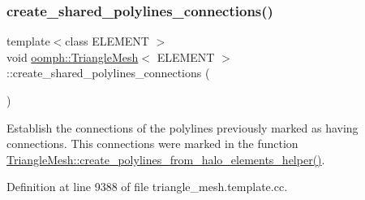 \mbox{\label{classoomph_1_1TriangleMesh_a2645a78aa55dacf39530dd087d894d79}} 
\subsubsection{\texorpdfstring{create\+\_\+shared\+\_\+polylines\+\_\+connections()}{create\_shared\_polylines\_connections()}}
{\footnotesize\ttfamily template$<$class E\+L\+E\+M\+E\+NT $>$ \\
void \hyperlink{classoomph_1_1TriangleMesh}{oomph\+::\+Triangle\+Mesh}$<$ E\+L\+E\+M\+E\+NT $>$\+::create\+\_\+shared\+\_\+polylines\+\_\+connections (\begin{DoxyParamCaption}{ }\end{DoxyParamCaption})\hspace{0.3cm}{\ttfamily [protected]}}



Establish the connections of the polylines previously marked as having connections. This connections were marked in the function \hyperlink{classoomph_1_1TriangleMesh_a1589b532530c3a8ddfb88f93b2e832ea}{Triangle\+Mesh\+::create\+\_\+polylines\+\_\+from\+\_\+halo\+\_\+elements\+\_\+helper()}. 



Definition at line 9388 of file triangle\+\_\+mesh.\+template.\+cc.

\mbox{\label{classoomph_1_1TriangleMesh_af1eda8f65bd1578619cd4cc2ffddf692}} 
